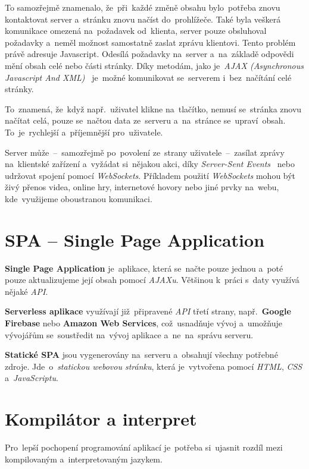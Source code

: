 \documentclass[11pt,a4paper]{report}
\begin{document}
            To samozřejmě znamenalo, že~při~každé změně obsahu bylo~potřeba znovu kontaktovat server a~stránku znovu načíst do~prohlížeče. Také byla veškerá komunikace omezená na~požadavek od~klienta, server pouze obsluhoval požadavky a~neměl možnost samostatně zaslat zprávu klientovi. Tento problém právě adresuje Javascript. Odesílá požadavky na~server a~na~základě odpovědi mění obsah celé nebo části stránky. Díky metodám, jako je~\emph{AJAX (Asynchronous Javascript And XML)}~\cite{ajax:mdn} je~možné komunikovat se~serverem i~bez~načítání celé stránky.

            To~znamená, že~když např.~uživatel klikne na~tlačítko, nemusí se~stránka znovu načítat celá, pouze se~načtou data ze~serveru a~na~stránce se~upraví~obsah. To~je~rychlejší a~příjemnější pro~uživatele.

            Server může~--~samozřejmě po~povolení ze~strany uživatele~--~zasílat zprávy na~klientské zařízení a~vyžádat si~nějakou akci, díky \emph{Server-Sent Events}~\cite{sse:mdn} nebo udržovat spojení pomocí \emph{WebSockets}. Příkladem použití \emph{WebSockets} mohou být živý přenos videa, online hry, internetové hovory nebo jiné prvky na~webu, kde~využijeme oboustranou komunikaci.~\cite{websocket:mdn}

        \section{SPA -- Single Page Application}
            \textbf{Single Page Application} je~aplikace, která se~načte pouze jednou a~poté pouze aktualizujeme její obsah pomocí \emph{AJAXu}. Většinou k~práci s~daty využívá nějaké \emph{API}.

            \textbf{Serverless aplikace} využívají již~připravené \emph{API} třetí strany, např.~\textbf{Google Firebase} nebo \textbf{Amazon Web Services}, což~usnadňuje vývoj a~umožňuje vývojářům se~soustředit na~vývoj aplikace a~ne~na~správu serveru.
            
            \textbf{Statické SPA} jsou vygenerovány na~serveru a~obsahují všechny potřebné zdroje. Jde~o~\emph{statickou webovou stránku}, která je~vytvořena pomocí \emph{HTML}, \emph{CSS} a~\emph{JavaScriptu}.
        
        \section{Kompilátor a interpret}
            Pro~lepší pochopení programování aplikací je~potřeba si~ujasnit rozdíl mezi kompilovaným a~interpretovaným jazykem.
\end{document}

